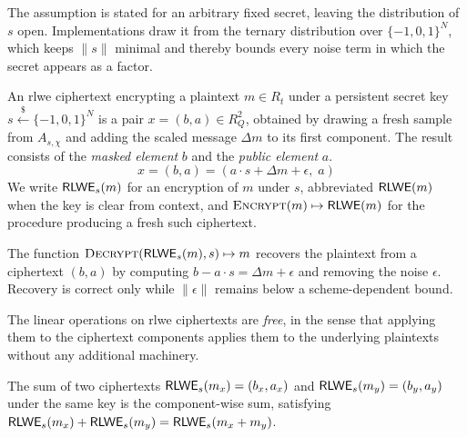 The assumption is stated for an arbitrary fixed secret, leaving the distribution of $s$ open. Implementations draw it from the ternary distribution over $\{-1, 0, 1\}^N$, which keeps $\|s\|$ minimal and thereby bounds every noise term in which the secret appears as a factor.

\begin{definition}
    \label{def:rlwe}
    An \gls{rlwe} ciphertext encrypting a plaintext $m \in R_t$ under a persistent secret key $s \overset{\$}{\leftarrow} \{-1, 0, 1\}^N$ is a pair $x = (b, a) \in R_Q^2$, obtained by drawing a fresh sample from $A_{s,\chi}$ and adding the scaled message $\Delta m$ to its first component. The result consists of the \emph{masked element} $b$ and the \emph{public element} $a$.
    \begin{equation}
        \label{eq:rlwe}
        x = (b, a) = (a \cdot s + \Delta m + \epsilon,\; a)
    \end{equation}
    We write $\mathsf{RLWE}_s(m)$ for an encryption of $m$ under $s$, abbreviated $\mathsf{RLWE}(m)$ when the key is clear from context, and $\Call{Encrypt}{m} \mapsto \rlwe(m)$ for the procedure producing a fresh such ciphertext.
\end{definition}


\begin{definition}[Decryption]
    \label{def:decrypt-generic}
    The function $\Call{Decrypt}{\rlwe_s(m), s} \mapsto m$ recovers the plaintext from a ciphertext $(b, a)$ by computing $b - a \cdot s = \Delta m + \epsilon$ and removing the noise $\epsilon$. Recovery is correct only while $\|\epsilon\|$ remains below a scheme-dependent bound.
\end{definition}

The linear operations on \gls{rlwe} ciphertexts are \emph{free}, in the sense that applying them to the ciphertext components applies them to the underlying plaintexts without any additional machinery.

\begin{definition}[Addition]
    \label{def:rlwe-add}
    The sum of two ciphertexts $\mathsf{RLWE}_s(m_x) = (b_x, a_x)$ and $\mathsf{RLWE}_s(m_y) = (b_y, a_y)$ under the same key is the component-wise sum, satisfying $\mathsf{RLWE}_s(m_x) + \mathsf{RLWE}_s(m_y) = \mathsf{RLWE}_s(m_x + m_y)$.
\end{definition}

